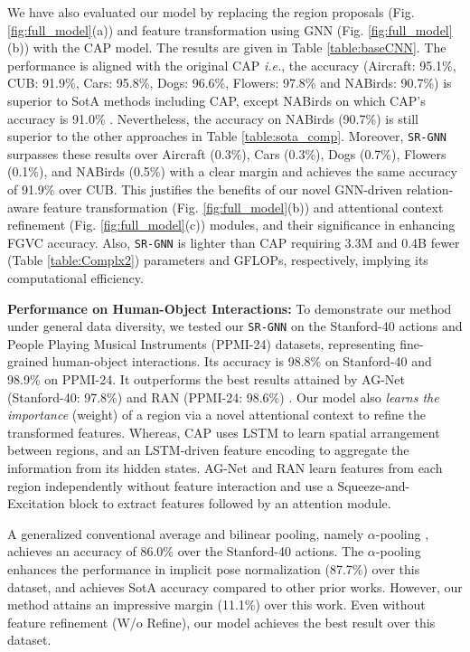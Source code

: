 \documentclass[journal]{IEEEtran}
\begin{document}
We have also evaluated our model by replacing the region proposals (Fig. \ref{fig:full_model}(a)) and feature transformation using GNN (Fig. \ref{fig:full_model}(b)) with the CAP \cite{behera2021context} model. The results are given in Table \ref{table:baseCNN}. The performance is aligned with the original CAP \textit{i.e.}, the accuracy (Aircraft: 95.1\%, CUB: 91.9\%, Cars: 95.8\%, Dogs: 96.6\%, Flowers: 97.8\% and NABirds: 90.7\%) is superior to SotA methods including CAP, except NABirds on which CAP’s accuracy is 91.0\% \cite{behera2021context}. Nevertheless, the accuracy on NABirds (90.7\%) is still superior to the other approaches in Table \ref{table:sota_comp}. Moreover, \texttt{SR-GNN} surpasses these results over Aircraft (0.3\%), Cars (0.3\%), Dogs (0.7\%), Flowers (0.1\%), and NABirds (0.5\%) with a clear margin and achieves the same accuracy of 91.9\% over CUB. This justifies the benefits of our novel GNN-driven relation-aware feature transformation (Fig. \ref{fig:full_model}(b)) and attentional context refinement (Fig. \ref{fig:full_model}(c)) modules, and their significance in enhancing FGVC accuracy. Also, \texttt{SR-GNN} is lighter than CAP requiring 3.3M and 0.4B fewer (Table \ref{table:Complx2}) parameters and GFLOPs, respectively, implying its computational efficiency. 

\noindent\textbf{Performance on Human-Object Interactions:} To demonstrate our method under general data diversity, we tested our \texttt{SR-GNN} on the Stanford-40 actions \cite{yao2011human} and People Playing Musical Instruments (PPMI-24) \cite{yao2010grouplet} datasets, representing fine-grained human-object interactions. Its accuracy is 98.8\% on Stanford-40 and 98.9\% on PPMI-24. It outperforms the best results attained by AG-Net (Stanford-40: 97.8\%) \cite{bera2021attend} and RAN (PPMI-24: 98.6\%) \cite{behera2020regional}. Our model also \textit{learns the importance} (weight) of a region via a novel attentional context to refine the transformed features. Whereas, CAP uses LSTM to learn spatial arrangement between regions, and an LSTM-driven feature encoding to aggregate the information from its hidden states. AG-Net and RAN learn features from each region independently without feature interaction and use a Squeeze-and-Excitation block to extract features followed by an attention module.

A generalized conventional average and bilinear pooling, namely $\alpha$-pooling \cite{simon2017generalized}, achieves an accuracy of 86.0\%  over the Stanford-40 actions. The $\alpha$-pooling enhances the performance in implicit pose normalization (87.7\%) \cite{simon2018whole} over this dataset, and achieves SotA accuracy compared to other prior works. However, our method attains an impressive margin (11.1\%) over this work. Even without feature refinement (W/o Refine), our model achieves the best result over this dataset. 
\end{document}
